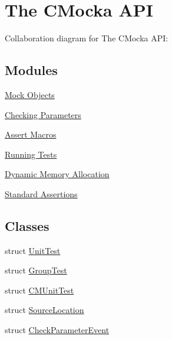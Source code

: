 \hypertarget{group__cmocka}{}\section{The C\+Mocka A\+PI}
\label{group__cmocka}
Collaboration diagram for The C\+Mocka A\+PI\+:
\subsection*{Modules}
\begin{DoxyCompactItemize}
\item 
\hyperlink{group__cmocka__mock}{Mock Objects}
\item 
\hyperlink{group__cmocka__param}{Checking Parameters}
\item 
\hyperlink{group__cmocka__asserts}{Assert Macros}
\item 
\hyperlink{group__cmocka__exec}{Running Tests}
\item 
\hyperlink{group__cmocka__alloc}{Dynamic Memory Allocation}
\item 
\hyperlink{group__cmocka__mock__assert}{Standard Assertions}
\end{DoxyCompactItemize}
\subsection*{Classes}
\begin{DoxyCompactItemize}
\item 
struct \hyperlink{structUnitTest}{Unit\+Test}
\item 
struct \hyperlink{structGroupTest}{Group\+Test}
\item 
struct \hyperlink{structCMUnitTest}{C\+M\+Unit\+Test}
\item 
struct \hyperlink{structSourceLocation}{Source\+Location}
\item 
struct \hyperlink{structCheckParameterEvent}{Check\+Parameter\+Event}
\end{DoxyCompactItemize}

